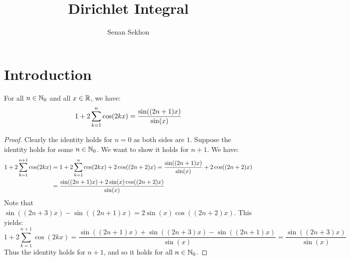 \documentclass[main.tex]{subfiles}
\title{Dirichlet Integral}
\author{Senan Sekhon}
\date{\DTMToday}
\begin{document}
\maketitle

\VersionTimestamp

\section{Introduction}

\begin{lemma}\label{dirichlet_kernel}
    For all $n\in\N_0$ and all $x\in\R$, we have:
    \begin{equation*}
        1+2\sum_{k=1}^n\cos(2kx) = \frac{\sin((2n+1)x)}{\sin(x)}
    \end{equation*}
\end{lemma}
\begin{proof}
    Clearly the identity holds for $n=0$ as both sides are $1$. Suppose the identity holds for some $n\in\N_0$. We want to show it holds for $n+1$. We have:
    \begin{align*}
        1+2\sum_{k=1}^{n+1}\cos(2kx)
        &= 1+2\sum_{k=1}^n\cos(2kx)+2\cos((2n+2)x)=\frac{\sin((2n+1)x)}{\sin(x)}+2\cos((2n+2)x) \\
        &= \frac{\sin((2n+1)x)+2\sin(x)\cos((2n+2)x)}{\sin(x)}
    \end{align*}
    Note that $\sin((2n+3)x)-\sin((2n+1)x)=2\sin(x)\cos((2n+2)x)$. This yields:
    \begin{equation*}
        1+2\sum_{k=1}^{n+1}\cos(2kx)
        = \frac{\sin((2n+1)x)+\sin((2n+3)x)-\sin((2n+1)x)}{\sin(x)}
        = \frac{\sin((2n+3)x)}{\sin(x)}
    \end{equation*}
    Thus the identity holds for $n+1$, and so it holds for all $n\in\N_0$.
\end{proof}
\end{document}
